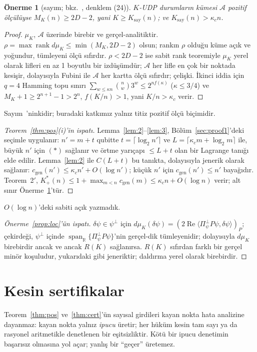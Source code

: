\documentclass[aps,pra,onecolumn,superscriptaddress,nofootinbib,longbibliography,10pt]{revtex4-2}
\newtheorem{proposition}{Önerme}[section]
\theoremstyle{definition}
\newcommand{\RR}{\mathbb R}
\newcommand{\spanR}{\operatorname{span}_{\RR}}
\newcommand{\Pperp}{\Pi^{\perp}_{\psi}}
\newcommand{\kc}{\kappa_c}
\newcommand{\Kp}{K^{*}_{+}}
\newcommand{\Kc}{K_{\mathrm{say}}}
\newcommand{\cgen}{c_{\mathrm{gen}}}
\begin{document}
\begin{proposition}[sayım; bkz.~\cite{LW02}, denklem (24)]\label{prop:count}
$K$-UDP durumların kümesi $\mathcal A$ pozitif ölçülüyse $M_K(n)\ge2D-2$, yani $K\ge\Kc(n)$; ve $\Kc(n)>\kc n$.
\end{proposition}
\begin{proof}
$\mu_K$, $\mathcal A$ üzerinde birebir ve gerçel-analitiktir. $\rho=\max\operatorname{rank}d\mu_K\le\min(M_K,2D-2)$ olsun; rankın $\rho$ olduğu küme açık ve yoğundur, tümleyeni ölçü sıfırdır. $\rho<2D-2$ ise sabit rank teoremiyle $\mu_K$ yerel olarak lifleri en az 1 boyutlu bir izdüşümdür; $\mathcal A$ her lifle en çok bir noktada kesişir, dolayısıyla Fubini ile $\mathcal A$ her kartta ölçü sıfırdır; çelişki. İkinci iddia için $q=4$ Hamming topu sınırı $\sum_{w\le\kappa n}\binom nw3^w\le2^{nf(\kappa)}$ ($\kappa\le3/4$) ve $M_K+1\ge2^{n+1}-1>2^n$, $f(K/n)>1$, yani $K/n>\kc$ verir.
\end{proof}
\noindent Sayım~\cite{LW02}'ninkidir; buradaki katkımız yalnız titiz pozitif ölçü biçimidir.

\begin{proof}[Teorem~\ref{thm:pos}(i)'in ispatı]
Lemma~\ref{lem:2}--\ref{lem:3}, Bölüm~\ref{sec:proof1}'deki seçimle uygulanır: $n'=m+t$ qubitte $t=\lceil\log_2n'\rceil$ ve $L=\lceil\kc m+\log_2m\rceil$ ile, büyük $n'$ için $(*)$ sağlanır ve örtme yarıçapı $\le L+t$ olan bir Lagrange tanığı elde edilir. Lemma~\ref{lem:2} ile $C(L+t)$ bu tanıkta, dolayısıyla jenerik olarak sağlanır: $\cgen(n')\le\kc n'+O(\log n')$; küçük $n'$ için $\cgen(n')\le n'$ bayağıdır. Teorem~2$'$, $\Kp(n)\le1+\max_{m<n}\cgen(m)\le\kc n+O(\log n)$ verir; alt sınır Önerme~\ref{prop:count}'tür.
\end{proof}
\noindent $O(\log n)$'deki sabiti açık yazmadık.

\begin{proof}[Önerme~\ref{prop:loc}'ün ispatı]
$\delta\psi\in\psi^\perp$ için $d\mu_K(\delta\psi)=(2\operatorname{Re}\langle\Pperp P\psi,\delta\psi\rangle)_P$; çekirdeği, $\psi^\perp$ içinde $\spanR\{\Pperp P\psi\}$'nin gerçel-dik tümleyenidir; dolayısıyla $d\mu_K$ birebirdir ancak ve ancak $R(K)$ sağlanırsa. $R(K)$ sıfırdan farklı bir gerçel minör koşuludur, yukarıdaki gibi jeneriktir; daldırma yerel olarak birebirdir.
\end{proof}

\section{Kesin sertifikalar}\label{sec:exact}
Teorem~\ref{thm:pos} ve~\ref{thm:cert}'ün sayısal girdileri kayan nokta hata analizine dayanmaz: kayan nokta yalnız \emph{ipucu} üretir; her hüküm kesin tam sayı ya da rasyonel aritmetikle denetlenen bir eşitsizliktir. Kötü bir ipucu denetimin başarısız olmasına yol açar; yanlış bir ``geçer'' üretemez.
\end{document}
